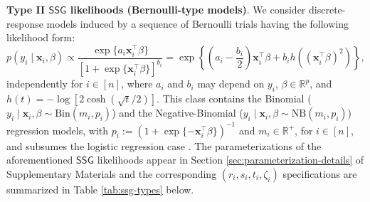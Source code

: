 \documentclass[12pt]{article}
\numberwithin{equation}{section}
\newcommand{\ssg}{\mathsf{SSG}}
\begin{document}
\textbf{Type II $\ssg$ likelihoods (Bernoulli-type models)}.
We consider discrete-response models induced by a sequence of {Bernoulli} trials having the following likelihood form:
%
\begin{equation}
\label{eq:SSG-typeII-likelihood}
p(y_i \mid \mathbf{x}_i, \beta) \propto 
\frac{\exp\{a_i \mathbf{x}_i^{\top}\beta\}}{\left[1 + \exp\{\mathbf{x}_i^{\top}\beta\}\right]^{b_i}} 
= \exp\left\{\left(a_i-\frac{b_i}{2}\right)\mathbf{x}_i^{\top}\beta + b_i h\left((\mathbf{x}_i^{\top}\beta)^2\right)\right\},
\end{equation}
%
independently for $i \in [n]$, where $a_i$ and $b_i$ may depend on $y_i$, $\beta \in \mathbb{R}^p$, and $h(t) = -\log\left[2\cosh(\sqrt{t}/2)\right]$. This class contains the {Binomial} ($y_i\mid \mathbf{x}_i, \beta \sim \mathrm{Bin}(m_i, p_i)$) and the {Negative-Binomial} ($y_i\mid \mathbf{x}_i, \beta \sim \mathrm{NB}(m_i, p_i)$) regression models, with $p_i := (1+ \exp\{-\mathbf{x}_i^{\top}\beta\})^{-1}$ and $m_i \in \mathbb{R}^{+}$, for $i\in [n]$, and subsumes the {logistic} regression case \citep{Jaakkola-Jordan-2000}. The parameterizations of the aforementioned $\ssg$ likelihoods appear in Section \ref{sec:parameterization-details} of Supplementary Materials and the corresponding $(r_i, s_i, t_i, \zeta_i)$ specifications are summarized in Table \ref{tab:ssg-types} below.
\end{document}
